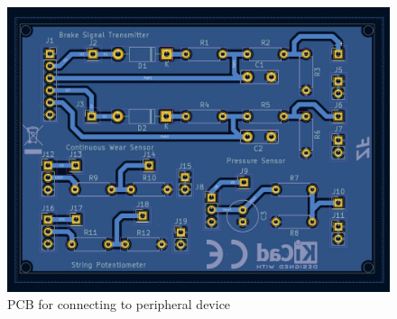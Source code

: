 \documentclass[8pt,compress,aspectratio=169]{beamer}
\begin{document}
\begin{frame}
  \hfill
  \begin{minipage}{0.45\textwidth}
    \begin{figure}
      \includegraphics[width=\textwidth]{assets/electronic/peri_pcb.jpg}
      \caption{PCB for connecting to peripheral device}
    \end{figure}
  \end{minipage}
\end{frame}
\end{document}

